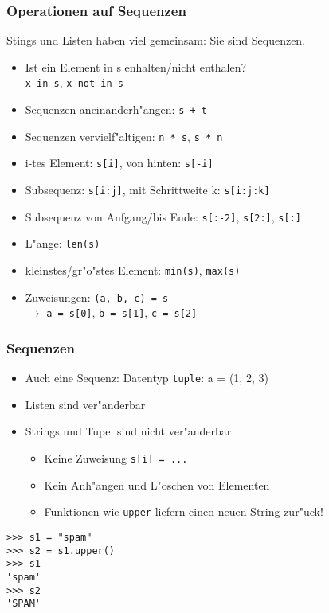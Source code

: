 \begin{frame}
\frametitle{Operationen auf Sequenzen}
Stings und Listen haben viel gemeinsam: Sie sind \alert{Sequenzen}.
\begin{itemize}
\item Ist ein Element in s enhalten/nicht enthalen?\\
 \lstinline{x in s}, \lstinline{x not in s}
\item Sequenzen aneinanderh"angen: \lstinline{s + t}
\item Sequenzen vervielf"altigen: \lstinline{n * s}, \lstinline{s * n}
\item i-tes Element: \lstinline{s[i]}, von hinten: \lstinline{s[-i]}
\item Subsequenz: \lstinline{s[i:j]}, mit Schrittweite k: \lstinline{s[i:j:k]}
\item Subsequenz von Anfgang/bis Ende: \lstinline{s[:-2]}, \lstinline{s[2:]}, \lstinline{s[:]}
\item L"ange: \lstinline{len(s)}
\item kleinstes/gr"o"stes Element: \lstinline{min(s)}, \lstinline{max(s)}
\item Zuweisungen: \lstinline{(a, b, c) = s} \\
$\rightarrow$ \lstinline{a = s[0]}, \lstinline{b = s[1]}, \lstinline{c = s[2]}
\end{itemize}
\end{frame}

\begin{frame}[fragile]
\frametitle{Sequenzen}
\begin{itemize}
\item Auch eine Sequenz: Datentyp \alert{\texttt{tuple}}: a = (1, 2, 3)
\item Listen sind ver"anderbar
\item Strings und Tupel sind nicht ver"anderbar
\begin{itemize}
\item Keine Zuweisung \lstinline{s[i] = ...}
\item Kein Anh"angen und L"oschen von Elementen
\item Funktionen wie \texttt{upper} liefern einen neuen String zur"uck!
\end{itemize}
\end{itemize}
\begin{lstlisting}[style=Shell]
>>> s1 = "spam"
>>> s2 = s1.upper()
>>> s1
'spam'
>>> s2
'SPAM'
\end{lstlisting}
\end{frame}

